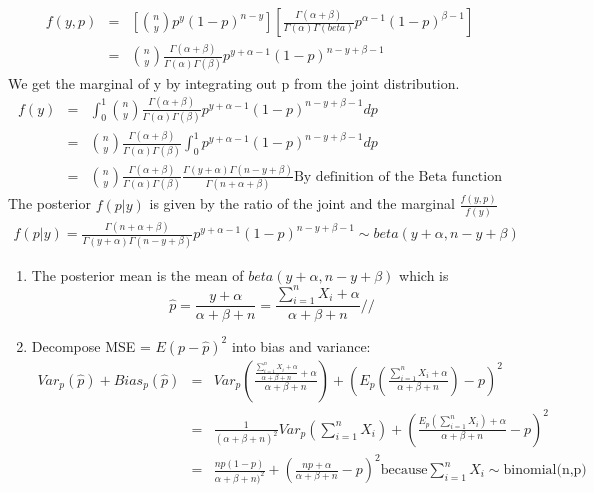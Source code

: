 \documentclass{article}
\begin{document}
\begin{enumerate}
    \begin{eqnarray*}
        f(y,p) &=& \left[{n \choose y}p^y(1-p)^{n-y}\right] \left[\frac{\Gamma(\alpha + \beta)}{\Gamma(\alpha)\Gamma(
        beta)}p^{\alpha-1}(1-p)^{\beta-1}\right]\\
               &=& {n \choose y}\frac{\Gamma(\alpha + \beta)}{\Gamma(\alpha)\Gamma(\beta)}p^{y+\alpha-1}(1-p)^{n-y+\beta-1}
    \end{eqnarray*}
    We get the marginal of y by integrating out p from the joint distribution.
    \begin{eqnarray*}
      f(y) &=& \int_0^1{n \choose y}\frac{\Gamma(\alpha + \beta)}{\Gamma(\alpha)\Gamma(\beta)}p^{y+\alpha-1}(1-p)^{n-y+\beta-1}dp \\
           &=&{n \choose y}\frac{\Gamma(\alpha + \beta)}{\Gamma(\alpha)\Gamma(\beta)}\int_0^1 p^{y+\alpha-1}(1-p)^{n-y+\beta-1}dp \\
           &=&{n \choose y}\frac{\Gamma(\alpha + \beta)}{\Gamma(\alpha)\Gamma(\beta)}\frac{\Gamma(y+\alpha)\Gamma(n-y+\beta)}{\Gamma(n + \alpha + \beta)}  \text{By definition of the Beta function}
    \end{eqnarray*}
    The posterior $f(p|y)$ is given by the ratio of the joint and the marginal $\frac{f(y,p)}{f(y)}$
    \begin{eqnarray*}
      f(p|y)=\frac{\Gamma(n + \alpha + \beta)}{\Gamma(y+\alpha)\Gamma(n-y+\beta)}p^{y+\alpha-1}(1-p)^{n-y+\beta-1} \sim beta(y+\alpha,n-y+\beta)
    \end{eqnarray*}
      \begin{enumerate}
        \item The posterior mean is the mean of $beta(y+\alpha,n-y+\beta)$ which is
        $$\hat{p}=\frac{y+\alpha}{\alpha + \beta + n}=\frac{\sum_{i=1}^{n}X_i+\alpha}{\alpha + \beta + n}//$$
        \item Decompose MSE = $E(p-\hat{p})^2$ into bias and variance:
         \begin{eqnarray*}
            Var_p(\hat{p}) + Bias_p(\hat{p}) &=& Var_p\left(\frac{\frac{\sum_{i=1}^{n}X_i+\alpha}{\alpha + \beta + n}+\alpha}{\alpha + \beta + n}\right) + \left(E_p\left(\frac{\sum_{i=1}^{n}X_i+\alpha}{\alpha + \beta + n}\right)-p\right)^2\\
                                             &=& \frac{1}{(\alpha + \beta + n)^2}Var_p\left(\sum_{i=1}^{n}X_i\right) + \left(\frac{E_p\left(\sum_{i=1}^{n}X_i\right)+\alpha}{\alpha + \beta + n}-p\right)^2 \\
                                             &=& \frac{np(1-p)}{\alpha + \beta + n)^2} + \left(\frac{np + \alpha}{\alpha + \beta + n} -p\right)^2 \text{because} \sum_{i=1}^{n}X_i\sim \text{binomial(n,p)}

\end{eqnarray*}
\end{enumerate}
\end{enumerate}
\end{document}
